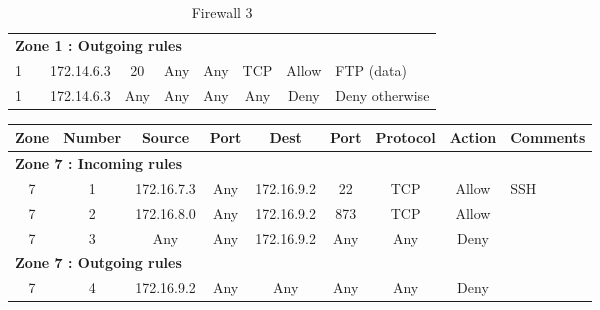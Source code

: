 \documentclass[a4paper,titlepage]{article}
\begin{document}
\begin{table}[h]
\begin{tabular}{c|c|cc|cc|ccl}
		\hline
		\multicolumn{9}{l}{\textbf{Zone 1 : Outgoing rules}}\\
		1 &  & 172.14.6.3 & 20 & Any & Any & TCP & Allow & FTP (data)\\
		1 &  & 172.14.6.3 & Any & Any & Any & Any & Deny & Deny otherwise\\
	\end{tabular}
	\caption{Firewall 3}
\end{table}





\begin{table}[h]
	\center
	\begin{tabular}{c|c|cc|cc|ccl}
		Zone & Number & Source & Port & Dest & Port & Protocol & Action & \multicolumn{1}{c}{Comments}\\
		\hline
		\multicolumn{9}{l}{\textbf{Zone 7 : Incoming rules}}\\
		7 & 1 & 172.16.7.3 & Any & 172.16.9.2 & 22 & TCP & Allow & SSH\\
		7 & 2 & 172.16.8.0 & Any & 172.16.9.2 & 873 & TCP & Allow & \\
		7 & 3 & Any & Any & 172.16.9.2 & Any & Any & Deny & \\
		\hline
		\multicolumn{9}{l}{\textbf{Zone 7 : Outgoing rules}}\\
		7 & 4 & 172.16.9.2 & Any & Any & Any & Any & Deny & \\


\end{tabular}
\end{table}
\end{document}
